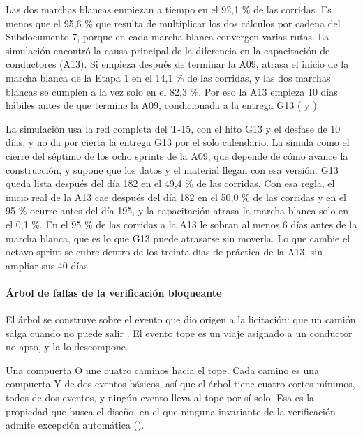 Las dos marchas blancas empiezan a tiempo en el 92,1 \% de las corridas. Es menos que el 95,6 \% que
resulta de multiplicar los dos cálculos por cadena del Subdocumento 7, porque en cada marcha blanca
convergen varias rutas. La simulación encontró la causa principal de la diferencia en la capacitación de
conductores (A13). Si empieza después de terminar la A09, atrasa el inicio de la marcha blanca de la
Etapa 1 en el 14,1 \% de las corridas, y las dos marchas blancas se cumplen a la vez solo en el 82,3 \%.
Por eso la A13 empieza 10 días hábiles antes de que termine la A09, condicionada a la entrega G13
( y ).

La simulación usa la red completa del T-15, con el hito G13 y el desfase de 10 días, y no da por cierta
la entrega G13 por el solo calendario. La simula como el cierre del séptimo de los ocho sprints de la
A09, que depende de cómo avance la construcción, y supone que los datos y el material llegan con esa
versión. G13 queda lista después del día 182 en el 49,4 \% de las corridas. Con esa regla, el inicio
real de la A13 cae después del día 182 en el 50,0 \% de las corridas y en el 95 \% ocurre antes del día
195, y la capacitación atrasa la marcha blanca solo en el 0,1 \%. En el 95 \% de las corridas a la A13
le sobran al menos 6 días antes de la marcha blanca, que es lo que G13 puede atrasarse sin moverla. Lo
que cambie el octavo sprint se cubre dentro de los treinta días de práctica de la A13, sin ampliar sus
40 días.

\paragraph{Árbol de fallas de la verificación bloqueante}
El árbol se construye sobre el evento que dio origen a la licitación: que un camión salga cuando no puede
salir . El evento tope es un viaje asignado a un conductor no apto, y la
 lo descompone.


Una compuerta O une cuatro caminos hacia el tope. Cada camino es una compuerta Y de dos eventos básicos,
así que el árbol tiene cuatro cortes mínimos, todos de dos eventos, y ningún evento lleva al tope por sí
solo. Esa es la propiedad que busca el diseño, en el que ninguna invariante de la verificación admite
excepción automática ().

